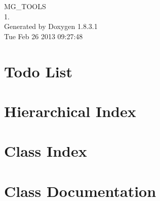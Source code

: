 \documentclass{book}
\begin{document}
\hypersetup{pageanchor=false,citecolor=blue}
\begin{titlepage}
\vspace*{7cm}
\begin{center}
{\Large M\-G\-\_\-\-T\-O\-O\-L\-S \\[1ex]\large 1. }\\
\vspace*{1cm}
{\large Generated by Doxygen 1.8.3.1}\\
\vspace*{0.5cm}
{\small Tue Feb 26 2013 09:27:48}\\
\end{center}
\end{titlepage}
\clearemptydoublepage
{}
\tableofcontents
\clearemptydoublepage
{}
\hypersetup{pageanchor=true,citecolor=blue}
\chapter{Todo List}
\label{todo}
\hypertarget{todo}{}

\chapter{Hierarchical Index}

\chapter{Class Index}

\chapter{Class Documentation}















\printindex
\end{document}
